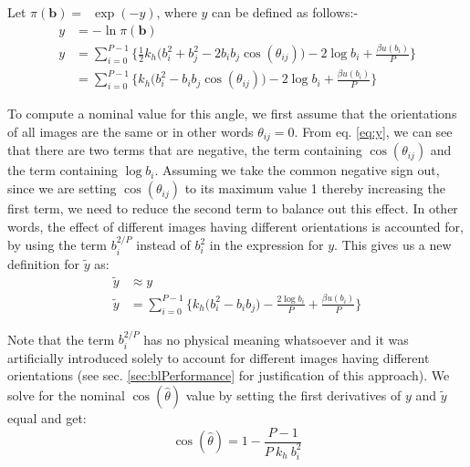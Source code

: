         Let $\pi(\mathbf{b}) = $~$ \exp (-y)$, where $y$ can be defined as follows:-
        \begin{equation}
        \label{eq:y}
            \begin{aligned}
                y &= -\ln \pi(\mathbf{b})\\
                y &= \displaystyle\sum\limits_{i=0}^{P-1} \Bigg\{ \frac{1}{2}  k_h  \Big( b_i^2 + b_j^2 - 2  b_i  b_j  \cos (\theta_{ij}) \Big) - 2  \log b_i + \frac{ \beta  u (b_i)}{P} \Bigg\}\\
                &= \displaystyle\sum\limits_{i=0}^{P-1} \Bigg\{ k_h  \Big( b_i^2 - b_i  b_j  \cos (\theta_{ij}) \Big) - 2  \log b_i + \frac{ \beta  u (b_i)}{P} \Bigg\}
            \end{aligned}
        \end{equation}

        To compute a nominal value for this angle, we first assume that the orientations of all images are the same or in other words $\theta_{ij} = 0$. From eq. \eqref{eq:y}, we can see that there are two terms that are negative, the term containing $\cos (\theta_{ij})$ and the term containing $\log b_i$. Assuming we take the common negative sign out, since we are setting $\cos (\theta_{ij})$ to its maximum value 1 thereby increasing the first term, we need to reduce the second term to balance out this effect. In other words, the effect of different images having different orientations is accounted for, by using the term $b_i^{2/P}$ instead of $b_i^2$ in the expression for $y$. This gives us a new definition for $\tilde y$ as:
        \begin{equation}
        \label{eq:ytilde}
            \begin{aligned}
                \tilde y &\approx y\\
                \tilde y &= \displaystyle\sum\limits_{i=0}^{P-1} \Bigg\{ k_h  \Big( b_i^2 - b_i  b_j \Big) - \frac{2  \log b_i}{P} + \frac{ \beta  u (b_i)}{P} \Bigg\}
            \end{aligned}
        \end{equation}

        Note that the term $b_i^{2/P}$ has no physical meaning whatsoever and it was artificially introduced solely to account for different images having different orientations (see sec. \ref{sec:blPerformance} for justification of this approach). We solve for the nominal $\cos (\hat \theta)$ value by setting the first derivatives of $y$ and $\tilde y$ equal and get:
        \begin{equation}
        \label{eq:thetaHat}
            \cos (\hat \theta) = 1 - \frac{P-1}{P~k_h~b_i^2}
        \end{equation}

